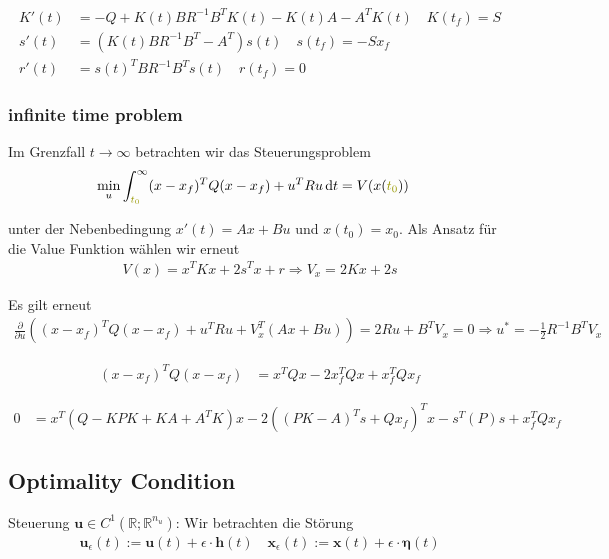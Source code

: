 \documentclass[a4paper, 12pt]{scrartcl}
\newcommand{\dunkelgelb}[2][dunkelgelb]{\textcolor{#1}{#2}}
\newcommand{\dt}{\thinspace \mathrm{d}t}
\begin{document}
\begin{align*}
K'(t) &= -Q+K(t) B R^{-1} B^T K(t) - K(t) A - A^T K(t) \quad K(t_f) = S \\
s'(t) &= (K(t) B R^{-1} B^T  - A^T) s(t) \quad s(t_f) = -S x_f  \\
r'(t) &= s(t)^T B R^{-1} B^T s(t) \quad r(t_f) = 0
\end{align*}

\subsubsection{infinite time problem}

Im Grenzfall $t \to \infty$ betrachten wir das Steuerungsproblem
%
\begin{align*}
\min_u &  \int_{\dunkelgelb{t_0}}^{\infty} (x-x_f)^T Q (x-x_f)  + u^T R u \dt 
= V(x(\dunkelgelb{t_0}))
\end{align*}

unter der Nebenbedingung $x'(t) = Ax+Bu$ und $x(t_0) = x_0$. Als Ansatz für die Value Funktion wählen wir erneut 
%
\begin{align*}
V(x) = x^T K x + 2s^T x + r \Rightarrow V_x = 2Kx + 2s
\end{align*}

Es gilt erneut 
%
\begin{align*}
\frac{\partial}{\partial u} \left((x-x_f)^T Q (x-x_f)  + u^T R u  + V_x^T (Ax+Bu) \right) = 2Ru + B^T V_x  = 0 \Rightarrow u^{*} = -\frac{1}{2} R^{-1} B^T V_x 
\end{align*}


\begin{align*}
(x-x_f)^T Q (x-x_f) 
&= x^T Q x - 2 x_f^T Q x + x_f^T Q x_f
\end{align*}

\begin{align*}
0 &= x^T ( Q - KPK + KA + A^T K ) x -2 ((PK-A)^T s + Qx_f)^T x - s^T (P) s + x_f^T Q x_f
\end{align*}

\subsection{Optimality Condition}

Steuerung $\bm{u}\in C^1(\mathbb{R};\mathbb{R}^{n_u})$: Wir betrachten die Störung 
\begin{align*}
    \bm{u}_\epsilon(t) := \bm{u}(t) + \epsilon \cdot \bm{h}(t) 
    \quad
    \bm{x}_\epsilon(t) := \bm{x}(t) + \epsilon \cdot \bm{\eta}(t) 
\end{align*}
\end{document}

